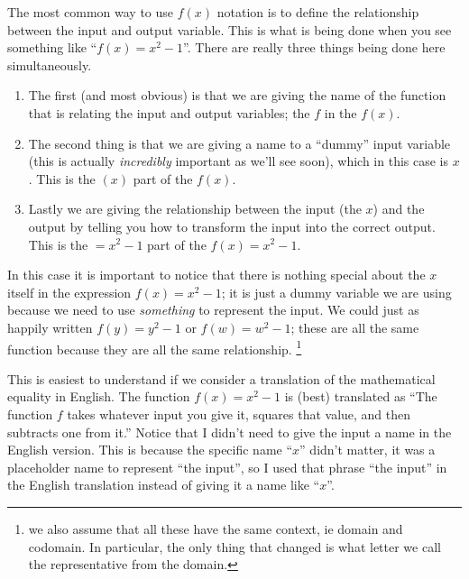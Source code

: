\documentclass{ximera}
\begin{document}
        The most common way to use $f(x)$ notation is to define the relationship between the input and output variable. This is what is being done when you see something like ``$f(x) = x^2 - 1$''. There are really three things being done here simultaneously. 
        \begin{enumerate}[label=\alph*)]
            \item The first (and most obvious) is that we are giving the name of the function that is relating the input and output variables; the $f$ in the $f(x)$. 
            \item The second thing is that we are giving a name to a ``dummy'' input variable (this is actually \textit{incredibly} important as we'll see soon), which in this case is $x$. This is the $(x)$ part of the $f(x)$.
            \item Lastly we are giving the relationship between the input (the $x$) and the output by telling you how to transform the input into the correct output. This is the $= x^2 - 1$ part of the $f(x) = x^2 - 1$. 
        \end{enumerate}
        In this case it is important to notice that there is nothing special about the $x$ itself in the expression $f(x) = x^2 - 1$; it is just a dummy variable we are using because we need to use \textit{something} to represent the input. We could just as happily written $f(y) = y^2 - 1$ or $f(w) = w^2 - 1$; these are all the same function because they are all the same relationship.%
        \footnote{we also assume that all these have the same context, ie domain and codomain. In particular, the only thing that changed is what letter we call the representative from the domain.}%
        
        This is easiest to understand if we consider a translation of the mathematical equality in English. The function $f(x) = x^2 - 1$ is (best) translated as ``The function $f$ takes whatever input you give it, squares that value, and then subtracts one from it.'' Notice that I didn't need to give the input a name in the English version. This is because the specific name ``$x$'' didn't matter, it was a placeholder name to represent ``the input'', so I used that phrase ``the input'' in the English translation instead of giving it a name like ``$x$''.
        
\end{document}
